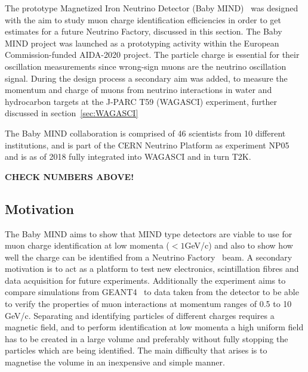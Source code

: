 
The prototype Magnetized Iron Neutrino Detector (Baby MIND)~\cite{26babyMIND} was designed with the aim to study muon charge identification efficiencies in order to get estimates for a future Neutrino Factory, discussed in this section. The Baby MIND project was launched as a prototyping activity within the European Commission-funded AIDA-2020 project. The particle charge is essential for their oscillation measurements since wrong-sign muons are the neutrino oscillation signal. During the design process a secondary aim was added, to measure the momentum and charge of muons from neutrino interactions in water and hydrocarbon targets at the J-PARC T59 (WAGASCI) experiment, further discussed in section~\ref{sec:WAGASCI}

The Baby MIND collaboration is comprised of 46 scientists from 10 different institutions, and is part of the CERN Neutrino Platform as experiment NP05~\cite{Fix2} and is as of 2018 fully integrated into WAGASCI and in turn T2K.

\textbf{CHECK NUMBERS ABOVE!}

\subsection{Motivation}

The Baby MIND aims to show that MIND type detectors are viable to use for muon charge identification at low momenta ($<1$GeV/c) and also to show how well the charge can be identified from a Neutrino Factory~\cite{25NUfact} beam. A secondary motivation is to act as a platform to test new electronics, scintillation fibres and data acquisition for future experiments. Additionally the experiment aims to compare simulations from GEANT4~\cite{Geant4} to data taken from the detector to be able to verify the properties of muon interactions at momentum ranges of 0.5 to 10 GeV/c. Separating and identifying particles of different charges requires a magnetic field, and to perform identification at low momenta a high uniform field has to be created in a large volume and preferably without fully stopping the particles which are being identified. 
The main difficulty that arises is to magnetise the volume in an inexpensive and simple manner.

